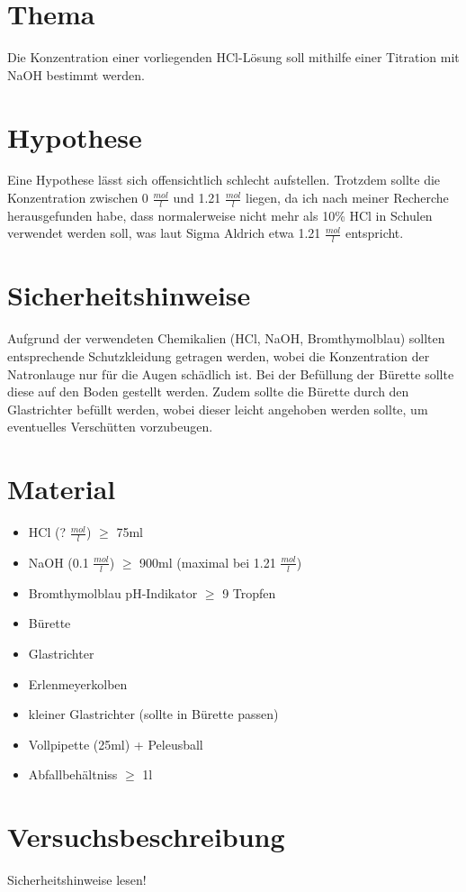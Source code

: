 \documentclass[8pt, letterpaper]{article}
\newcommand{\mpl}[1]{#1 \(\frac{mol}{l}\)}
\begin{document}
\section{Thema}
Die Konzentration einer vorliegenden HCl-Lösung soll mithilfe einer Titration mit NaOH bestimmt werden.

\section{Hypothese}
Eine Hypothese lässt sich offensichtlich schlecht aufstellen. Trotzdem sollte die Konzentration zwischen \mpl{0} und \mpl{1.21} liegen, da ich nach meiner Recherche herausgefunden habe, dass normalerweise nicht mehr als 10\% HCl in Schulen verwendet werden soll, was laut Sigma Aldrich etwa \mpl{1.21} entspricht.

\section{Sicherheitshinweise}
Aufgrund der verwendeten Chemikalien (HCl, NaOH, Bromthymolblau) sollten entsprechende Schutzkleidung getragen werden, wobei die Konzentration der Natronlauge nur für die Augen schädlich ist.
Bei der Befüllung der Bürette sollte diese auf den Boden gestellt werden. Zudem sollte die Bürette durch den Glastrichter befüllt werden, wobei dieser leicht angehoben werden sollte, um eventuelles Verschütten vorzubeugen.

\section{Material}
\begin{itemize}
    \item HCl (\mpl{?}) \(\ge\) 75ml
    \item NaOH (\mpl{0.1}) \(\ge\) 900ml (maximal bei \mpl{1.21})
    \item Bromthymolblau pH-Indikator \(\ge\) 9 Tropfen
    \item Bürette
    \item Glastrichter
    \item Erlenmeyerkolben
    \item kleiner Glastrichter (sollte in Bürette passen)
    \item Vollpipette (25ml) + Peleusball
    \item Abfallbehältniss \(\ge\) 1l
\end{itemize}

\section{Versuchsbeschreibung}
Sicherheitshinweise lesen!
\end{document}
